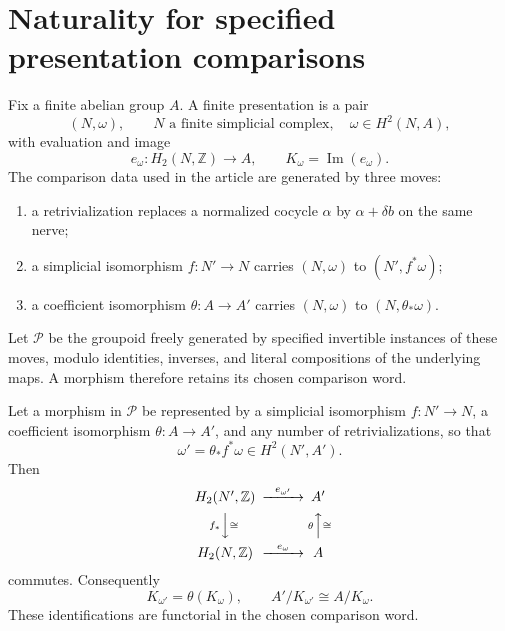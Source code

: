 \section{Naturality for specified presentation comparisons}
\label{sec:presentation-naturality}

Fix a finite abelian group \(A\).  A finite presentation is a pair
\[
 (N,\omega),
 \qquad N\text{ a finite simplicial complex},\quad
 \omega\in H^2(N,A),
\]
with evaluation and image
\[
 e_\omega:H_2(N,\mathbb Z)\longrightarrow A,
 \qquad K_\omega=\operatorname{Im}(e_\omega).
\]
The comparison data used in the article are generated by three moves:
\begin{enumerate}[label=(\roman*),nosep]
\item a retrivialization replaces a normalized cocycle \(\alpha\) by
      \(\alpha+\delta b\) on the same nerve;
\item a simplicial isomorphism \(f:N'\to N\) carries
      \((N,\omega)\) to \((N',f^*\omega)\);
\item a coefficient isomorphism \(\theta:A\to A'\) carries
      \((N,\omega)\) to \((N,\theta_*\omega)\).
\end{enumerate}
Let \(\mathscr P\) be the groupoid freely generated by specified invertible
instances of these moves, modulo identities, inverses, and literal
compositions of the underlying maps.  A morphism therefore retains its
chosen comparison word.

\begin{proposition}
\label{prop:presentation-comparison-naturality}
Let a morphism in \(\mathscr P\) be represented by a simplicial isomorphism
\(f:N'\to N\), a coefficient isomorphism \(\theta:A\to A'\), and any number
of retrivializations, so that
\[
 \omega'=\theta_*f^*\omega\in H^2(N',A').
\]
Then
\begin{equation}\label{eq:presentation-evaluation-square}
\begin{CD}
H_2(N',\mathbb Z) @>{e_{\omega'}}>> A'\\
@V{f_*}V{\cong}V @A{\theta}A{\cong}A\\
H_2(N,\mathbb Z) @>{e_\omega}>> A
\end{CD}
\end{equation}
commutes.  Consequently
\[
 K_{\omega'}=\theta(K_\omega),
 \qquad A'/K_{\omega'}\cong A/K_\omega.
\]
These identifications are functorial in the chosen comparison word.
\end{proposition}

